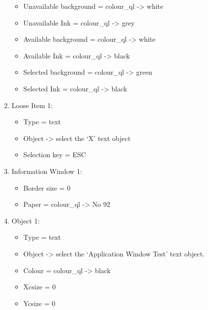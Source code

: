\begin{enumerate}
{\begin{itemize}[itemsep=0pt]
\item{}Unavailable background = colour\_ql -{}>{} white


\item{}Unavailable Ink = colour\_ql -{}>{} grey


\item{}Available background = colour\_ql -{}>{} white


\item{}Available Ink = colour\_ql -{}>{} black


\item{}Selected background = colour\_ql -{}>{} green


\item{}Selected Ink = colour\_ql -{}>{} black

\end{itemize}
}
\item{Loose Item 1:
\begin{itemize}[itemsep=0pt]

\item{}Type = text


\item{}Object -{}>{} select the `X' text object


\item{}Selection key = ESC

\end{itemize}
}
\item{Information Window 1:
\begin{itemize}[itemsep=0pt]

\item{}Border size = 0


\item{}Paper = colour\_ql -{}>{} No 92

\end{itemize}
}
\item{Object 1:
\begin{itemize}[itemsep=0pt]

\item{}Type = text


\item{}Object -{}>{} select the `Application Window Test' text
            object.


\item{}Colour = colour\_ql -{}>{} black


\item{}Xcsize = 0


\item{}Ycsize = 0


\end{itemize}}
\end{enumerate}
